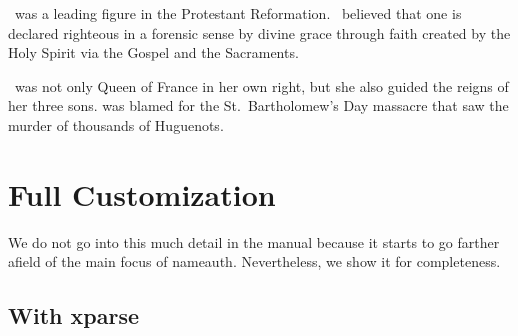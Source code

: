 \documentclass[oneside]{article}
\begin{document}
\newif\ifCaps      %
\Capstrue          %

\renewcommand*\textSC[1]{\ifCaps\textsc{#1}\else#1\fi}

\renewcommand*\AltCaps[1]{%
  \ifInHook
    \ifFirstCap\MakeUppercase{#1}\else#1\fi
  \else
    #1%
  \fi
}
\renewcommand*\CapThis{\FirstCaptrue}

\renewcommand*\NamesFormat[1]
  {\InHooktrue#1\global\FirstCapfalse}

\renewcommand*\MainNameHook[1]
  {\Capsfalse\InHooktrue#1\global\FirstCapfalse}

\let\FrontNamesFormat\Namesformat
\let\FrontNameHook\MainNameHook

\ForgetThis\Luth\ was a leading figure in the Protestant
Reformation. \Luth\ believed that one is declared
righteous in a forensic sense by divine grace through faith
created by the Holy Spirit via the Gospel and the Sacraments.

\ForgetThis\Cath\ was not only Queen of France in her own right,
but she also guided the reigns of her three sons.
\CapThis\LCath[\noexpand\AltCaps{d}e']
was blamed for the St.\ Bartholomew's Day massacre that saw the
murder of thousands of Huguenots.

\renewcommand*\NamesFormat{}
\newcommand*\FrontNamesFormat{}
\renewcommand*\MainNameHook{}
\renewcommand*\FrontNameHook{}

%
%

\section{Full Customization}

We do not go into this much detail in the manual because it starts to go farther afield of the main focus of \textsf{nameauth}. Nevertheless, we show it for completeness.

\subsection[With xparse]{With \textsf{xparse}}

\makeatletter


  {}
\end{document}
